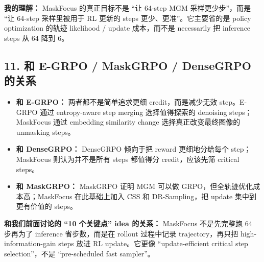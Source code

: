 \begin{summarybox}
\textbf{我的理解：} MaskFocus 的真正目标不是 ``让 64-step MGM 采样更少步''，而是 ``让 64-step 采样里被用于 RL 更新的 steps 更少、更准''。它主要省的是 policy optimization 的轨迹 likelihood / update 成本，而不是 necessarily 把 inference steps 从 64 降到 6。
\end{summarybox}

\subsection{11. 和 E-GRPO / MaskGRPO / DenseGRPO 的关系}

\begin{center}
\end{center}

\begin{itemize}[leftmargin=1.5em]
  \item \textbf{和 E-GRPO：} 两者都不是简单追求更细 credit，而是减少无效 step。E-GRPO 通过 entropy-aware step merging 选择值得探索的 denoising steps；MaskFocus 通过 embedding similarity change 选择真正改变最终图像的 unmasking steps。
  \item \textbf{和 DenseGRPO：} DenseGRPO 倾向于把 reward 更细地分给每个 step；MaskFocus 则认为并不是所有 steps 都值得分 credit，应该先筛 critical steps。
  \item \textbf{和 MaskGRPO：} MaskGRPO 证明 MGM 可以做 GRPO，但全轨迹优化成本高；MaskFocus 在此基础上加入 CSS 和 DR-Sampling，把 update 集中到更有价值的 steps。
\end{itemize}

\begin{intubox}
\textbf{和我们前面讨论的 ``10 个关键点'' idea 的关系：} MaskFocus 不是先完整跑 64 步再为了 inference 省步数，而是在 rollout 过程中记录 trajectory，再只把 high-information-gain steps 放进 RL update。它更像 ``update-efficient critical step selection''，不是 ``pre-scheduled fast sampler''。
\end{intubox}

